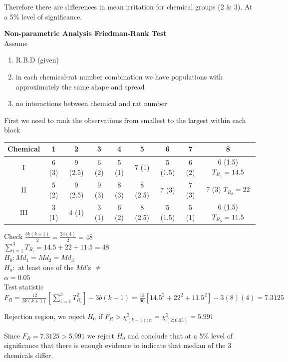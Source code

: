 \documentclass{article}
\begin{document}
\begin{enumerate}[1.]
\begin{enumerate}[1)]
Therefore there are differences in mean irritation for chemical groups (2 \& 3). At a 5\% level of significance. 

\end{enumerate}

\textbf{Non-parametric Analysis Friedman-Rank Test} \\
Assume 
\begin{enumerate}[1)]
\item R.B.D (given)
\item in each chemical-rat number combination we have populations with approximately the same shape and spread
\item no interactions between chemical and rat number
\end{enumerate}

First we need to rank the observations from smallest to the largest within each block


\begin{center}
 \begin{tabular}{||c c c c c c c c c||} 
 \hline
Chemical & 1 & 2 & 3 & 4 & 5 & 6 & 7 & 8 \\ [0.5ex] 
 \hline\hline
I & 6  (3) & 9 (2.5) & 6 (2) & 5 (1) & 7 (1) & 5 (1.5) & 6 (2) & 6 (1.5) $T_{R_1} = 14.5$ \\
\hline
II & 5 (2) & 9 (2.5) & 9 (3) & 8 (3) & 8 (2.5) & 7 (3) & 7 (3) & 7 (3) $T_{R_2} = 22$\\
\hline
III & 3 (1) & 4 (1) & 3 (1) & 6 (2) & 8  (2.5)& 5 (1.5) & 5 (1) & 6 (1.5) $T_{R_3} = 11.5$\\ [1ex]
 \hline
\end{tabular}
\end{center}

Check $\frac{bk(k+1)}{2} = \frac{24(4)}{2} = 48$ \\
$\sum_{i=1}^{3}{T_{R_i}} = 14.5 + 22 + 11.5 = 48$ \\

$H_0: Md_1 = Md_2 = Md_3$ \\
$H_a:$ at least one of the $Md$'s $\neq$ \\
$\alpha = 0.05$ \\

Test statistic $F_R = \frac{12}{bk(k+1)}[\sum_{i=1}^{3}{T_{R_i}^2}] - 3b(k+1) = \frac{12}{96}[14.5^2 + 22^2 + 11.5^2] - 3(8)(4) = 7.3125$

Rejection region, we reject $H_0$ if $F_R > \chi_{(k-1); \alpha}^2 = \chi_{(2; 0.05)}^2 = 5.991$

Since $F_R = 7.3125 > 5.991$ we reject $H_0$ and conclude that at a 5\% level of significance that there is enough evidence to indicate that median of the 3 chemicals differ.


\end{enumerate}
\end{document}

